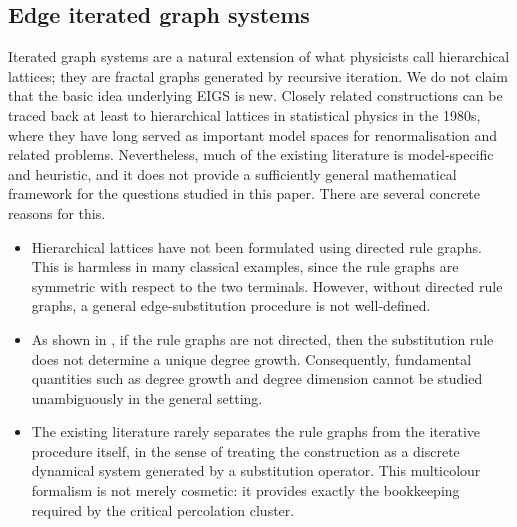 \documentclass{article}
\theoremstyle{plain}
\theoremstyle{definition}
\begin{document}


\subsection{Edge iterated graph systems}\label{subsec:eigs}

Iterated graph systems are a natural extension of what physicists call hierarchical lattices; they
are fractal graphs generated by recursive iteration.
We do not claim that the basic idea underlying EIGS is new.
Closely related constructions can be traced back at least to hierarchical lattices in statistical physics in the 1980s, where they have long served as important model spaces for renormalisation and related problems. Nevertheless, much of the existing literature is model-specific and heuristic, and it does not provide a sufficiently general mathematical framework for the questions studied in this paper. 
There are several concrete reasons for this.

\begin{itemize}
    \item Hierarchical lattices have not been formulated using directed rule graphs. 
    This is harmless in many classical examples, since the rule graphs are symmetric with respect to the two terminals. However, without directed rule graphs, a general edge-substitution procedure is not well-defined.

    \item As shown in \cite{li2024on}, if the rule graphs are not directed, then the substitution rule does not determine a unique degree growth. Consequently, fundamental quantities such as degree growth and degree dimension cannot be studied unambiguously in the general setting.

    \item The existing literature rarely separates the rule graphs from the iterative procedure itself, in the sense of treating the construction as a discrete dynamical system generated by a substitution operator. 
    This multicolour formalism is not merely cosmetic: it provides exactly the bookkeeping required by the critical percolation cluster.
\end{itemize}
\end{document}
